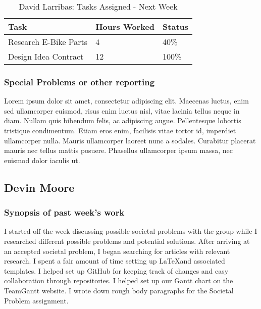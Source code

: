\documentclass[12pt,article,compsoc]{IEEEtran}
\begin{document}
	\begin{table}[ht]
	\renewcommand{\arraystretch}{1.3}
		\caption{David Larribas: Tasks Assigned - Next Week}
		
		\label{Summary of David Larribas' activites: this week}
		
		\centering
		\begin{tabular}{p{5.5cm}|p{1cm}|p{1cm}}
		\hline

		\bfseries 	Task		 		& \bfseries Hours Worked	& \bfseries Status	\\
		\hline\hline
		
					Research E-Bike Parts
					& 4							&
					40\%				\\
					Design Idea Contract			& 12						& 100\%				\\	
		\hline
		\end{tabular}
	\end{table}

	\subsubsection*{Special Problems or other reporting}
	Lorem ipsum dolor sit amet, consectetur adipiscing elit. Maecenas luctus, enim sed ullamcorper euismod, risus enim luctus nisl, vitae lacinia tellus neque in diam. Nullam quis bibendum felis, ac adipiscing augue. Pellentesque lobortis tristique condimentum. Etiam eros enim, facilisis vitae tortor id, imperdiet ullamcorper nulla. Mauris ullamcorper laoreet nunc a sodales. Curabitur placerat mauris nec tellus mattis posuere. Phasellus ullamcorper ipsum massa, nec euismod dolor iaculis ut.
	\clearpage

\subsection{Devin Moore}

	\subsubsection*{Synopsis of past week's work}

	I started off the week discussing possible societal problems with the group while I researched different possible problems and potential solutions. After arriving at an accepted societal problem, I began searching for articles with relevant research. I spent a fair amount of time setting up \LaTeX and associated templates. I helped set up GitHub for keeping track of changes and easy collaboration through repositories. I helped set up our Gantt chart on the TeamGantt website. I wrote down rough body paragraphs for the Societal Problem assignment.   
\end{document}

